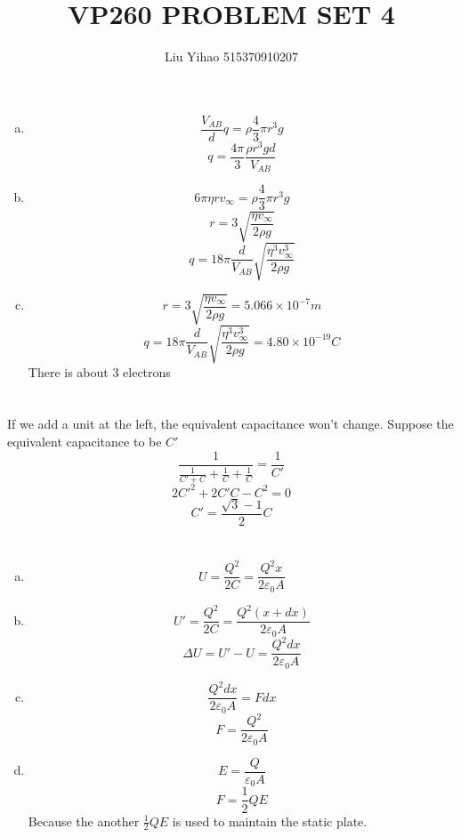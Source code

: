 \documentclass{article}
\title{VP260 PROBLEM SET 4}
\author{Liu Yihao 515370910207}
\date{}
\begin{document}
\maketitle

\section{}
\begin{enumerate}[(a)]
\item
$$\frac{V_{AB}}{d}q=\rho\frac{4}{3}\pi r^3g$$
$$q=\frac{4\pi}{3}\frac{\rho r^3gd}{V_{AB}}$$
\item
$$6\pi\eta rv_\infty=\rho\frac{4}{3}\pi r^3g$$
$$r=3\sqrt{\frac{\eta v_\infty}{2\rho g}}$$
$$q=18\pi\frac{d}{V_{AB}}\sqrt{\frac{\eta^3v^3_\infty}{2\rho g}}$$
\item
$$r=3\sqrt{\frac{\eta v_\infty}{2\rho g}}=5.066\times10^{-7}m$$
$$q=18\pi\frac{d}{V_{AB}}\sqrt{\frac{\eta^3v^3_\infty}{2\rho g}}=4.80\times10^{-19}C$$
There is about 3 electrons
\end{enumerate}

\section{}
If we add a unit at the left, the equivalent capacitance won't change.
Suppose the equivalent capacitance to be $C'$
$$\frac{1}{\frac{1}{C'+C}+\frac{1}{C}+\frac{1}{C}}=\frac{1}{C'}$$
$$2C'^2+2C'C-C^2=0$$
$$C'=\frac{\sqrt{3}-1}{2}C$$

\section{}
\begin{enumerate}[(a)]
\item
$$U=\frac{Q^2}{2C}=\frac{Q^2x}{2\varepsilon_0A}$$
\item
$$U'=\frac{Q^2}{2C}=\frac{Q^2(x+dx)}{2\varepsilon_0A}$$
$$\Delta U=U'-U=\frac{Q^2dx}{2\varepsilon_0A}$$
\item
$$\frac{Q^2dx}{2\varepsilon_0A}=Fdx$$
$$F=\frac{Q^2}{2\varepsilon_0A}$$
\item
$$E=\frac{Q}{\varepsilon_0A}$$
$$F=\frac{1}{2}QE$$
Because the another $\frac{1}{2}QE$ is used to maintain the static plate.

\end{enumerate}
\end{document}
